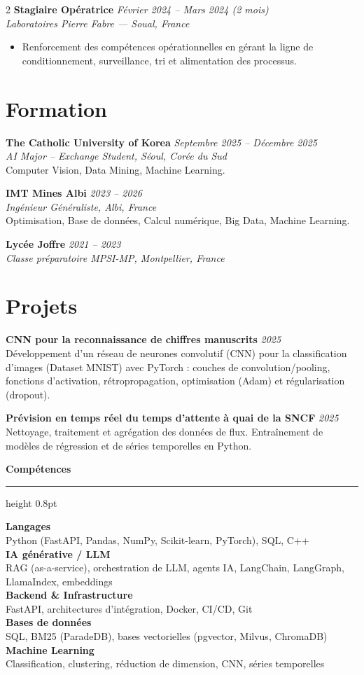 \documentclass[10.5pt,a4paper]{article}
\newcommand{\sectionrule}{\vspace{-6pt}{\color{accent}\hrule height 1pt}\vspace{2pt}}
\newcommand{\subsectitle}[1]{%
  {\color{accent}\bfseries\large #1}\\[-2pt]
  {\color{accent}\hrule height 0.8pt}\vspace{4pt}
}
\newcommand{\cvexp}[5]{%
  \noindent\textbf{#1} \hfill {\itshape\color{graytext}\small #4}\\
  {\itshape #2 --- #3}\\[-2pt]
  #5
  \vspace{5pt}
}
\newcommand{\cvedu}[5]{%
  \noindent\textbf{#1} \hfill {\itshape\color{graytext}\small #4}\\
  {\itshape #2, #3}\\[1pt]
  {\small #5}
  \vspace{2pt}
}
\newcommand{\cveduplain}[4]{%
  \noindent\textbf{#1} \hfill {\itshape\color{graytext}\small #4}\\
  {\itshape #2, #3}
  \vspace{2pt}
}
\newcommand{\cvproject}[3]{%
  \noindent\textbf{#1} \hfill {\itshape\color{graytext}\small #2}\\[1pt]
  {\small #3}
  \vspace{2pt}
}
\newcommand{\sidebarline}[2]{%
  \noindent\textbf{\small #1}\\
  {\small #2}\\[3pt]
}
\begin{document}
\begin{paracol}{2}
\cvexp{Stagiaire Opératrice}{Laboratoires Pierre Fabre}{Soual, France}{Février 2024 -- Mars 2024 (2 mois)}{%
  \begin{itemize}[leftmargin=12pt, itemsep=2pt, topsep=0pt, partopsep=0pt, parsep=0pt]
    \item Renforcement des compétences opérationnelles en gérant la ligne de conditionnement, surveillance, tri et alimentation des processus.
  \end{itemize}
}

\section*{Formation}
\sectionrule

\cvedu{The Catholic University of Korea}{AI Major -- Exchange Student}{Séoul, Corée du Sud}{Septembre 2025 -- Décembre 2025}{Computer Vision, Data Mining, Machine Learning.}

\cvedu{IMT Mines Albi}{Ingénieur Généraliste}{Albi, France}{2023 -- 2026}{Optimisation, Base de données, Calcul numérique, Big Data, Machine Learning.}

\cveduplain{Lycée Joffre}{Classe préparatoire MPSI-MP}{Montpellier, France}{2021 -- 2023}

\section*{Projets}
\sectionrule

\cvproject{CNN pour la reconnaissance de chiffres manuscrits}{2025}{Développement d'un réseau de neurones convolutif (CNN) pour la classification d'images (Dataset MNIST) avec PyTorch : couches de convolution/pooling, fonctions d'activation, rétropropagation, optimisation (Adam) et régularisation (dropout).}

\cvproject{Prévision en temps réel du temps d'attente à quai de la SNCF}{2025}{Nettoyage, traitement et agrégation des données de flux. Entraînement de modèles de régression et de séries temporelles en Python.}

\switchcolumn

\vspace{2pt}

\subsectitle{Compétences}

\sidebarline{Langages}{Python (FastAPI, Pandas, NumPy, Scikit-learn, PyTorch), SQL, C++}
\sidebarline{IA générative / LLM}{RAG (as-a-service), orchestration de LLM, agents IA, LangChain, LangGraph, LlamaIndex, embeddings}
\sidebarline{Backend \& Infrastructure}{FastAPI, architectures d'intégration, Docker, CI/CD, Git}
\sidebarline{Bases de données}{SQL, BM25 (ParadeDB), bases vectorielles (pgvector, Milvus, ChromaDB)}
\sidebarline{Machine Learning}{Classification, clustering, réduction de dimension, CNN, séries temporelles}


\end{paracol}
\end{document}
